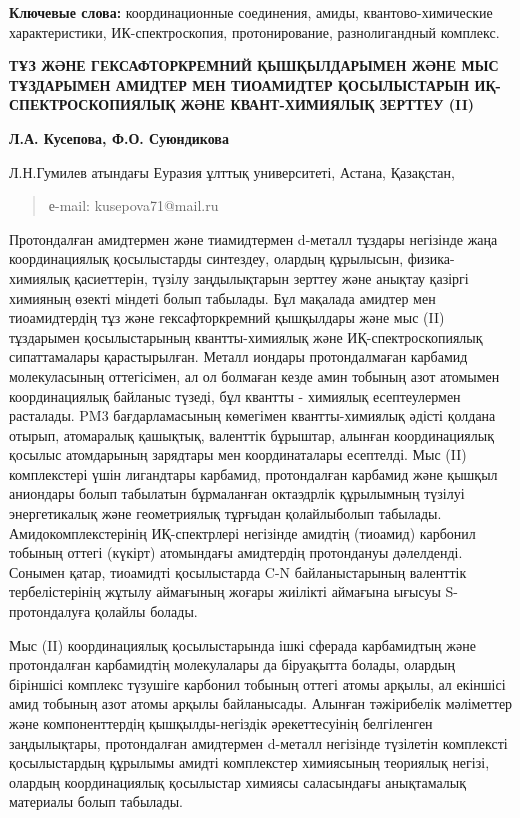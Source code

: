 {\bfseries Ключевые слова:} координационные соединения, амиды,
квантово-химические характеристики, ИК-спектроскопия, протонирование,
разнолигандный комплекс.

{\bfseries ТҰЗ ЖӘНЕ ГЕКСАФТОРКРЕМНИЙ ҚЫШҚЫЛДАРЫМЕН ЖӘНЕ МЫС ТҰЗДАРЫМЕН
АМИДТЕР МЕН ТИОАМИДТЕР ҚОСЫЛЫСТАРЫН ИҚ-СПЕКТРОСКОПИЯЛЫҚ ЖӘНЕ
КВАНТ-ХИМИЯЛЫҚ ЗЕРТТЕУ (II)}

{\bfseries Л.А. Кусепова, Ф.О. Суюндикова}

Л.Н.Гумилев атындағы Еуразия ұлттық университеті, Астана, Қазақстан,

\begin{quote}
е-mail: kusepova71@mail.ru
\end{quote}

Протондалған амидтермен және тиамидтермен d-металл тұздары негізінде
жаңа координациялық қосылыстарды синтездеу, олардың құрылысын,
физика-химиялық қасиеттерін, түзілу заңдылықтарын зерттеу және анықтау
қазіргі химияның өзекті міндеті болып табылады. Бұл мақалада амидтер мен
тиоамидтердің тұз және гексафторкремний қышқылдары және мыс (II)
тұздарымен қосылыстарының квантты-химиялық және ИҚ-спектроскопиялық
сипаттамалары қарастырылған. Металл иондары протондалмаған карбамид
молекуласының оттегісімен, ал ол болмаған кезде амин тобының азот
атомымен координациялық байланыс түзеді, бұл квантты - химиялық
есептеулермен расталады. PM3 бағдарламасының көмегімен квантты-химиялық
әдісті қолдана отырып, атомаралық қашықтық, валенттік бұрыштар, алынған
координациялық қосылыс атомдарының зарядтары мен координаталары
есептелді. Мыс (II) комплекстері үшін лигандтары карбамид, протондалған
карбамид және қышқыл аниондары болып табылатын бұрмаланған октаэдрлік
құрылымның түзілуі энергетикалық және геометриялық тұрғыдан қолайлыболып
табылады. Амидокомплекстерінің ИҚ-спектрлері негізінде амидтің (тиоамид)
карбонил тобының оттегі (күкірт) атомындағы амидтердің протондануы
дәлелденді. Сонымен қатар, тиоамидті қосылыстарда C-N байланыстарының
валенттік тербелістерінің жұтылу аймағының жоғары жиілікті аймағына
ығысуы S-протондалуға қолайлы болады.

Мыс (II) координациялық қосылыстарында ішкі сферада карбамидтың және
протондалған карбамидтің молекулалары да біруақытта болады, олардың
біріншісі комплекс түзушіге карбонил тобының оттегі атомы арқылы, ал
екіншісі амид тобының азот атомы арқылы байланысады. Алынған тәжірибелік
мәліметтер және компоненттердің қышқылды-негіздік әрекеттесуінің
белгіленген заңдылықтары, протондалған амидтермен d-металл негізінде
түзілетін комплексті қосылыстардың құрылымы амидті комплекстер
химиясының теориялық негізі, олардың координациялық қосылыстар химиясы
саласындағы анықтамалық материалы болып табылады.

